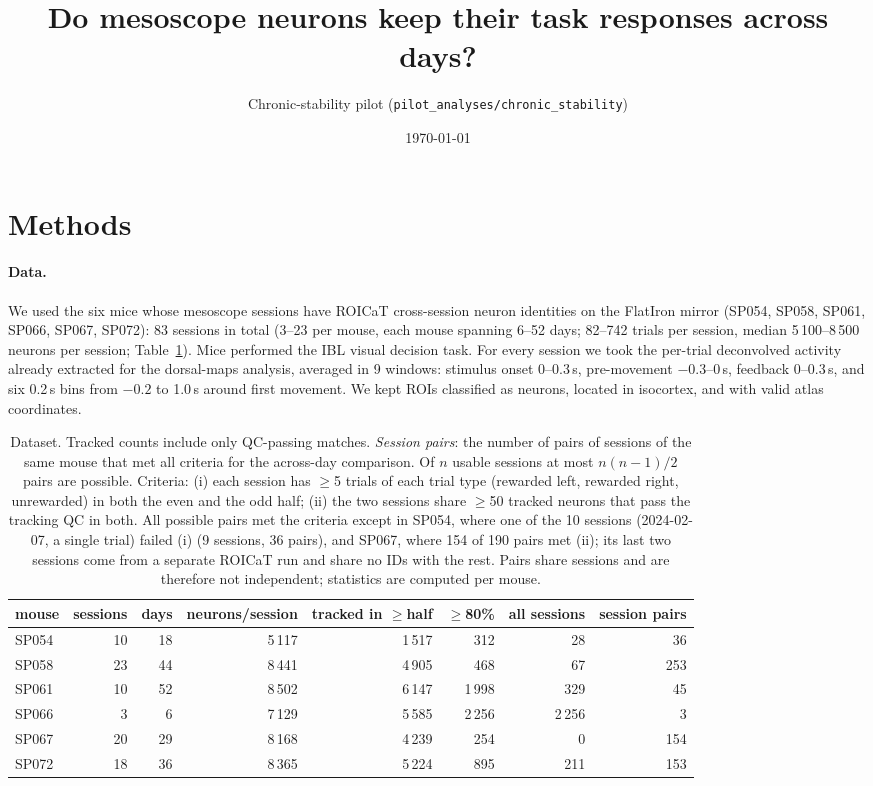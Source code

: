 \documentclass[10pt,a4paper]{article}
\title{Do mesoscope neurons keep their task responses across days?}
\author{Chronic-stability pilot (\texttt{pilot\_analyses/chronic\_stability})}
\date{\today}
\begin{document}
\maketitle

\section{Methods}

\paragraph{Data.}
We used the six mice whose mesoscope sessions have ROICaT cross-session neuron identities on the FlatIron mirror
(SP054, SP058, SP061, SP066, SP067, SP072): 83 sessions in total (3--23 per mouse, each mouse spanning 6--52 days;
82--742 trials per session, median 5\,100--8\,500 neurons per session; Table~\ref{tab:data}).
Mice performed the IBL visual decision task. For every session we took the per-trial deconvolved activity
already extracted for the dorsal-maps analysis, averaged in 9 windows: stimulus onset 0--0.3\,s, pre-movement
$-0.3$--0\,s, feedback 0--0.3\,s, and six 0.2\,s bins from $-0.2$ to 1.0\,s around first movement.
We kept ROIs classified as neurons, located in isocortex, and with valid atlas coordinates.

\begin{table}[h]
\centering\small
\begin{tabular}{lrrrrrrr}
\toprule
mouse & sessions & days & neurons/session & tracked in $\geq$half & $\geq$80\% & all sessions & session pairs\\
\midrule
SP054 & 10 & 18 & 5\,117 & 1\,517 & 312 & 28 & 36\\
SP058 & 23 & 44 & 8\,441 & 4\,905 & 468 & 67 & 253\\
SP061 & 10 & 52 & 8\,502 & 6\,147 & 1\,998 & 329 & 45\\
SP066 & 3 & 6 & 7\,129 & 5\,585 & 2\,256 & 2\,256 & 3\\
SP067 & 20 & 29 & 8\,168 & 4\,239 & 254 & 0 & 154\\
SP072 & 18 & 36 & 8\,365 & 5\,224 & 895 & 211 & 153\\
\bottomrule
\end{tabular}
\caption{Dataset. Tracked counts include only QC-passing matches. \emph{Session pairs}: the number of pairs of sessions of the same mouse that met all criteria for the across-day comparison. Of $n$ usable sessions at most $n(n-1)/2$ pairs are possible. Criteria: (i) each session has $\geq$5 trials of each trial type (rewarded left, rewarded right, unrewarded) in both the even and the odd half; (ii) the two sessions share $\geq$50 tracked neurons that pass the tracking QC in both. All possible pairs met the criteria except in SP054, where one of the 10 sessions (2024-02-07, a single trial) failed (i) (9 sessions, 36 pairs), and SP067, where 154 of 190 pairs met (ii); its last two sessions come from a separate ROICaT run and share no IDs with the rest. Pairs share sessions and are therefore not independent; statistics are computed per mouse.}
\label{tab:data}
\end{table}
\end{document}
